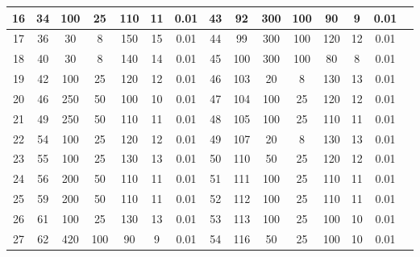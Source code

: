 \begin{table}
{\begin{tabular}{|c|c|c|c|c|c|c|c|c|c|c|c|c|c|c|}
    \hline
16	&	34	&	100	&	25	&	110	&	11	&	0.01	&	43	&	92	&	300	&	100	&	90	&	9	&	0.01\\ 
    \hline
17	&	36	&	30	&	8	&	150	&	15	&	0.01	&	44	&	99	&	300	&	100	&	120	&	12	&	0.01\\ 
    \hline
18	&	40	&	30	&	8	&	140	&	14	&	0.01	&	45	&	100	&	300	&	100	&	80	&	8	&	0.01\\ 
    \hline
19	&	42	&	100	&	25	&	120	&	12	&	0.01	&	46	&	103	&	20	&	8	&	130	&	13	&	0.01\\ 
    \hline
20	&	46	&	250	&	50	&	100	&	10	&	0.01	&	47	&	104	&	100	&	25	&	120	&	12	&	0.01\\ 
    \hline
21	&	49	&	250	&	50	&	110	&	11	&	0.01	&	48	&	105	&	100	&	25	&	110	&	11	&	0.01\\ 
    \hline
22	&	54	&	100	&	25	&	120	&	12	&	0.01	&	49	&	107	&	20	&	8	&	130	&	13	&	0.01\\ 
    \hline
23	&	55	&	100	&	25	&	130	&	13	&	0.01	&	50	&	110	&	50	&	25	&	120	&	12	&	0.01\\ 
    \hline
24	&	56	&	200	&	50	&	110	&	11	&	0.01	&	51	&	111	&	100	&	25	&	110	&	11	&	0.01\\ 
    \hline
25	&	59	&	200	&	50	&	110	&	11	&	0.01	&	52	&	112	&	100	&	25	&	110	&	11	&	0.01\\ 
    \hline
26	&	61	&	100	&	25	&	130	&	13	&	0.01	&	53	&	113	&	100	&	25	&	100	&	10	&	0.01\\ 
    \hline
27	&	62	&	420	&	100	&	90	&	9	&	0.01	&	54	&	116	&	50	&	25	&	100	&	10	&	0.01\\ 
    \hline
  \end{tabular} 
  } 
\end{table}

